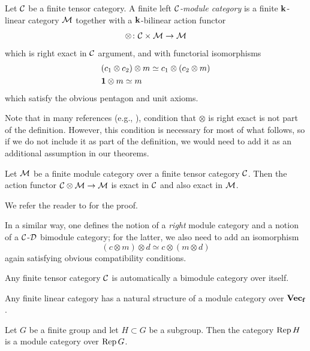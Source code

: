 \begin{definition}\label{d:module-cat}
  Let $\mathcal{C}$ be a finite tensor category. A finite left \emph{$\mathcal{C}$-module
  category} is a finite $\mathbf{k}$-linear category $\mathcal{M}$
  together with a $\mathbf{k}$-bilinear action functor
  $$
  \otimes\colon \mathcal{C} \times \mathcal{M} \to \mathcal{M}
  $$
  which is right exact in $\mathcal{C}$ argument, and with functorial isomorphisms
  \begin{align*}
  &(c_1\otimes c_2)\otimes m \simeq c_1 \otimes (c_2\otimes m)\\
  & \mathbf{1} \otimes m \simeq m
  \end{align*}
  which satisfy the obvious pentagon and unit axioms.
\end{definition}
Note that in many references (e.g., \cite{dsps-balanced}), condition that
$\otimes$ is right exact is not part of the definition. However, this condition
is necessary for most of what follows, so if we do not include it as part of the
definition, we would need to add it as an additional assumption in our theorems.
\begin{theorem}\label{t:module-action-exact}
  Let $\mathcal{M}$ be a finite module category over a finite tensor category $\mathcal{C}$.
  Then the action functor $\mathcal{C}\otimes \mathcal{M}\to\mathcal{M}$ is exact in
  $\mathcal{C}$ and also exact in $\mathcal{M}$.
\end{theorem}
We refer the reader to \cite[Corollary 2.26]{dsps-balanced} for the proof.

In a similar way, one defines the notion of a \emph{right} module category and a
notion of a $\mathcal{C}$-$\mathcal{D}$ bimodule category; for the latter, we also need to add
an isomorphism
$$
  (c\otimes m)\otimes d \simeq c\otimes (m\otimes d)
$$
again satisfying obvious compatibility conditions.

\begin{example}\label{x:tensor-self-bimodule}
  Any finite tensor category $\mathcal{C}$ is automatically a bimodule category
  over itself.
\end{example}

\begin{example}\label{x:linear-cat-module}
  Any finite linear category has a natural structure of a module category over
  $\mathbf{Vec_f}$.
\end{example}

\begin{example}\label{x:coset-module}
  Let $G$ be a finite group and let $H\subset G$ be a subgroup. Then the
  category $\operatorname{Rep} H$ is a module category over $\operatorname{Rep} G$.
\end{example}

